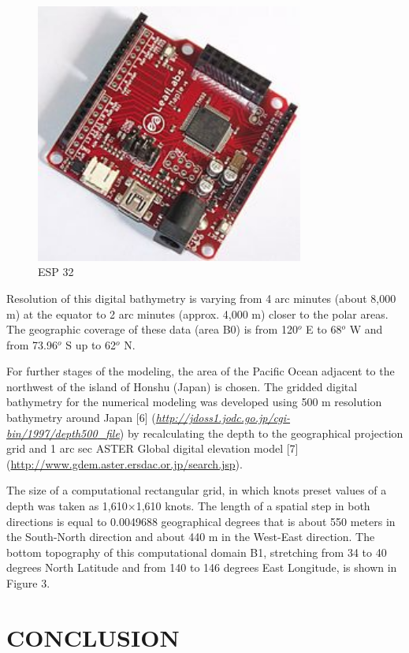 \documentclass{aip-cp}
\begin{document}
\begin{figure}[h]
  \centerline{\includegraphics[width=250pt]{art/Fig_02.png}}
  \caption{ ESP 32}
\end{figure}

Resolution of this digital bathymetry is varying from 4 arc minutes (about 
8,000 m) at the equator to 2 arc minutes (approx. 4,000 m) closer to the 
polar areas. The geographic coverage of these data (area B0) is from 
120$^{o}$ E to 68$^{o}$ W and from 73.96$^{o}$ S up to 62$^{o}$ N.

For further stages of the modeling, the area of the Pacific Ocean adjacent 
to the northwest of the island of Honshu (Japan) is chosen. The gridded 
digital bathymetry for the numerical modeling was developed using 500 m 
resolution bathymetry around Japan [6] (\underline 
{\textit{http://jdoss1.jodc.go.jp/cgi-bin/1997/depth500{\_}file}}) by 
recalculating the depth to the geographical projection grid and 1 
arc sec ASTER Global digital elevation model [7] (\underline 
{http://www.gdem.aster.ersdac.or.jp/search.jsp}).

The size of a computational rectangular grid, in which knots preset values 
of a depth was taken as 1,610$\times$1,610 knots. The length of a spatial step in 
both directions is equal to 0.0049688 geographical degrees that is about 550 
meters in the South-North direction and about 440 m in the West-East 
direction. The bottom topography of this computational domain B1, stretching 
from 34 to 40 degrees North Latitude and from 140 to 146 degrees East 
Longitude, is shown in Figure 3.



\section{CONCLUSION}
\end{document}
